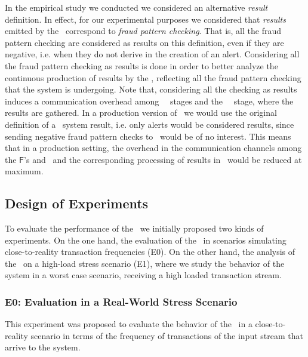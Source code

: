In the empirical study we conducted we considered an alternative \emph{result} definition. 
In effect, for our experimental purposes we considered that \emph{results} emitted by the \DPATM\ correspond to \emph{fraud pattern checking}.
That is, all the fraud pattern checking are considered as results on this definition, even if they are negative, i.e. when they do not derive in the creation of an alert. 
Considering all the fraud pattern checking as results is done 
in order to better analyze the continuous production of results by the \DPATM, 
reflecting all the fraud pattern checking that the system is undergoing. 
Note that, considering all the checking as results induces a communication overhead among  \filter\ \F\ stages and the \sink\ \Sk\ stage, 
where the results are gathered. In a production version of \DPATM\ we would use the original definition of a \DPATM\ system result, i.e. only alerts would be considered results, since sending negative fraud pattern checks to \Sk\ would be of no interest.
This means that in a production setting, the overhead in the communication channels among the $\mathsf{F}$'s 
and \Sk\ and the corresponding processing of results in \Sk\ would be reduced at maximum.

\subsection{Design of Experiments}\label{exps:design-of-experiments}

To evaluate the performance of the \DPATM\ we initially proposed two kinds of experiments. On the one hand, the evaluation of the \DPATM\ in scenarios simulating close-to-reality transaction frequencies (E0). On the other hand, the analysis of the \DPATM\ on a high-load stress scenario (E1), where we study the behavior of the system in a worst case scenario, receiving a high loaded transaction stream.\\

\subsubsection{E0: Evaluation in a Real-World Stress Scenario}

This experiment was proposed to evaluate the behavior of the \DPATM\ in a close-to-reality scenario in terms of the frequency of transactions of the input stream that arrive to the system.\\

